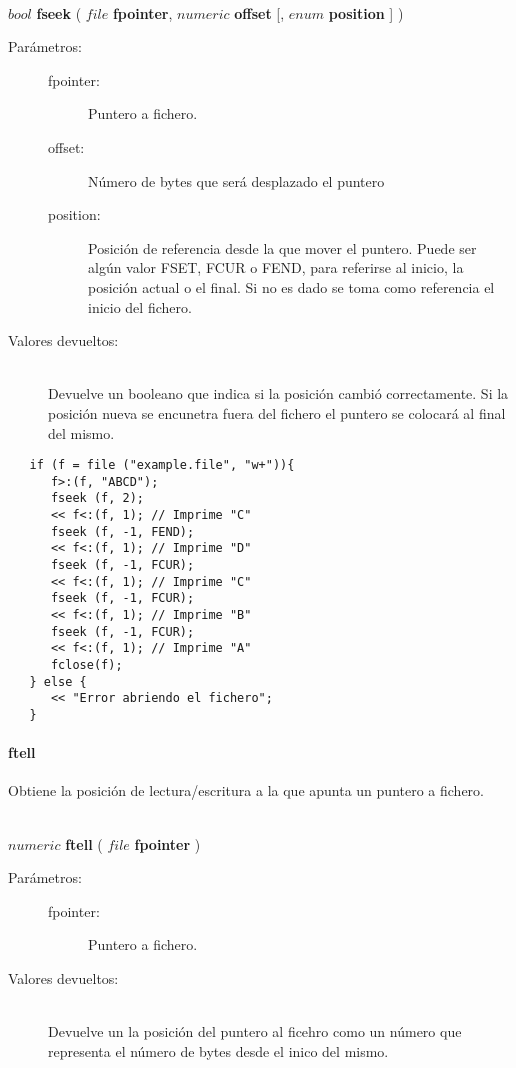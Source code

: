 \begin{framed}
\hfill \\ $bool$ \textbf{fseek} ( $file$ \textbf{fpointer}, $numeric$ \textbf{offset} [, $enum$ \textbf{position} ]  )  
\begin{description}
\item [Parámetros:] \hfill 
   \begin{description}
   \item[fpointer:] Puntero a fichero. 
   \item[offset:] Número de bytes que será desplazado el puntero
   \item[position:] Posición de referencia desde la que mover el puntero. Puede ser algún valor 
   FSET, FCUR o FEND, para referirse al inicio, la posición actual o el final. Si no es dado se
   toma como referencia el inicio del fichero.
   \end{description}
\item[Valores devueltos:] \hfill \\
   Devuelve un booleano que indica si la posición cambió correctamente. Si la posición 
   nueva se encunetra fuera del fichero el puntero se colocará al final del mismo.
\end{description}
\end{framed}

\begin{lstlisting}  
   if (f = file ("example.file", "w+")){
      f>:(f, "ABCD");
      fseek (f, 2);
      << f<:(f, 1); // Imprime "C"
      fseek (f, -1, FEND);
      << f<:(f, 1); // Imprime "D"
      fseek (f, -1, FCUR);
      << f<:(f, 1); // Imprime "C"
      fseek (f, -1, FCUR);
      << f<:(f, 1); // Imprime "B"
      fseek (f, -1, FCUR);
      << f<:(f, 1); // Imprime "A"
      fclose(f);
   } else {
      << "Error abriendo el fichero";
   }
\end{lstlisting}

\paragraph{ftell}
Obtiene la posición de lectura/escritura a la que apunta un puntero a fichero.

\begin{framed}
\hfill \\ $numeric$ \textbf{ftell} ( $file$ \textbf{fpointer}  )  
\begin{description}
\item [Parámetros:] \hfill 
   \begin{description}
   \item[fpointer:] Puntero a fichero. 
   \end{description}
\item[Valores devueltos:] \hfill \\
   Devuelve un la posición del puntero al ficehro como un número que representa el
   número de bytes desde el inico del mismo. 
\end{description}
\end{framed}

